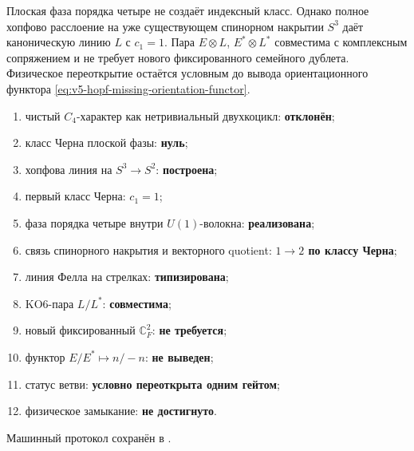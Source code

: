 \begin{theorem}
Плоская фаза порядка четыре не создаёт индексный класс. Однако полное
хопфово расслоение на уже существующем спинорном накрытии $S^3$ даёт
каноническую линию $L$ с $c_1=1$. Пара
$E\otimes L$, $E^*\otimes L^*$ совместима с комплексным сопряжением и не
требует нового фиксированного семейного дублета. Физическое переоткрытие
остаётся условным до вывода ориентационного функтора
\eqref{eq:v5-hopf-missing-orientation-functor}.
\end{theorem}

\begin{protocol}
\begin{enumerate}
 \item чистый $C_4$-характер как нетривиальный двухкоцикл:
 \textbf{отклонён};
 \item класс Черна плоской фазы: \textbf{нуль};
 \item хопфова линия на $S^3\to S^2$: \textbf{построена};
 \item первый класс Черна: \textbf{$c_1=1$};
 \item фаза порядка четыре внутри $U(1)$-волокна:
 \textbf{реализована};
 \item связь спинорного накрытия и векторного quotient:
 \textbf{$1\to2$ по классу Черна};
 \item линия Фелла на стрелках: \textbf{типизирована};
 \item KO6-пара $L/L^*$: \textbf{совместима};
 \item новый фиксированный $\mathbb C^2_F$: \textbf{не требуется};
 \item функтор $E/E^*\mapsto n/-n$: \textbf{не выведен};
 \item статус ветви: \textbf{условно переоткрыта одним гейтом};
 \item физическое замыкание: \textbf{не достигнуто}.
\end{enumerate}
\end{protocol}

Машинный протокол сохранён в
.